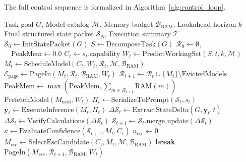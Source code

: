 The full control sequence is formalized in Algorithm~\ref{alg:control_loop}.

\begin{algorithm}[htbp]
\caption{ModelVM Runtime Control Loop}
\label{alg:control_loop}
\footnotesize
\begin{algorithmic}[1]
\Require Task goal $G$, Model catalog $\mathcal{M}$, Memory budget $\mathcal{B}_{\text{RAM}}$, Lookahead horizon $k$
\Ensure Final structured state packet $\mathcal{S}_N$, Execution summary $\mathcal{T}$
\State $\mathcal{S}_0 \gets \text{InitStatePacket}(G)$
\State $S \gets \text{DecomposeTask}(G)$ 
\State $\mathcal{R}_0 \gets \emptyset$, $\quad \text{PeakMem} \gets 0.0$
    \State $C_t \gets s_t.\text{capability}$
    \State $W_t \gets \text{PredictWorkingSet}(S, t, k, \mathcal{M})$ 
    \State $M_t \gets \text{ScheduleModel}(C_t, W_t, \mathcal{R}_t, \mathcal{M}, \mathcal{B}_{\text{RAM}})$
    \State $\mathcal{E}_{\text{page}} \gets \text{PageIn}(M_t, \mathcal{R}_t, \mathcal{B}_{\text{RAM}}, W_t)$ 
    \State $\mathcal{R}_{t+1} \gets \mathcal{R}_t \cup \{M_t\} \setminus \text{EvictedModels}$
    \State $\text{PeakMem} \gets \max(\text{PeakMem}, \sum_{m \in \mathcal{R}_{t+1}} \text{RAM}(m))$
        \State $\text{PrefetchModel}(M_{\text{next}}, W_t)$ 
    \EndIf
    \State $\Pi_t \gets \text{SerializeToPrompt}(\mathcal{S}_t, s_t)$
    \State $\mathbf{y}_t \gets \text{ExecuteInference}(M_t, \Pi_t)$ 
    \State $\Delta \mathcal{S}_t \gets \text{ExtractStateDelta}(G, \mathbf{y}_t, t)$
    \State $\Delta \mathcal{S}_t \gets \text{VerifyCalculations}(\Delta \mathcal{S}_t)$ 
    \State $\mathcal{S}_{t+1} \gets \mathcal{S}_t.\text{merge\_update}(\Delta \mathcal{S}_t)$
    \State $\kappa \gets \text{EvaluateConfidence}(\mathcal{S}_{t+1}, M_t, C_t)$
    \State $n_{\text{esc}} \gets 0$
        \State $M_{\text{esc}} \gets \text{SelectEscCandidate}(C_t, M_t, \mathcal{M}, \mathcal{B}_{\text{RAM}})$
         \textbf{break} \EndIf
        \State $\text{PageIn}(M_{\text{esc}}, \mathcal{R}_{t+1}, \mathcal{B}_{\text{RAM}}, W_t)$

\end{algorithmic}
\end{algorithm}
